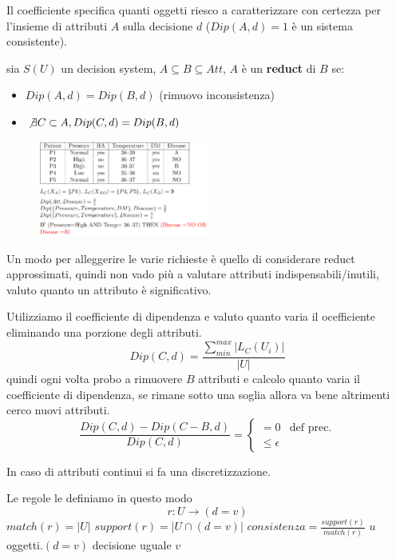 Il coefficiente specifica quanti oggetti riesco a caratterizzare con certezza per 
l'insieme di attributi $A$ sulla decisione $d$ ($Dip(A, d) =1$ è un sistema consistente). 

\begin{definizione}
    sia $S(U)$ un decision system,  $A\subseteq B\subseteq Att$, $A$ è un \textbf{reduct} di $B$ se:
    \begin{itemize}
        \item $Dip(A,d) =Dip(B,d)$ (rimuovo inconsistenza)
        \item $\not\exists C \subset A, Dip(C,d) =Dip(B,d)$
    \end{itemize}
\end{definizione}

\begin{figure}[!h]
    \centering
    \includegraphics[width=0.5\textwidth]{img/sistemi_incerti/rule-based-system-rough-apr2.png}
\end{figure}

Un modo per alleggerire le varie richieste è quello di considerare reduct approssimati,
quindi non vado più a valutare attributi indispensabili/inutili, valuto quanto 
un attributo è significativo. 

Utilizziamo il coefficiente di dipendenza e valuto quanto 
varia il ocefficiente eliminando una porzione degli attributi.
$$Dip(C,d) = \frac{\sum_{min}^{max}|L_C(U_i)|}{|U|}$$
quindi ogni volta probo a rimuovere $B$ attributi e calcolo quanto varia il coefficiente
di dipendenza, se rimane sotto una soglia allora va bene altrimenti cerco nuovi 
attributi.
$$\frac{Dip(C,d)-Dip(C-B,d)}{Dip(C,d)} = \begin{cases}
    =0 & \text{def prec.}\\
    \le \epsilon 
\end{cases}$$

\begin{nota}
    In caso di attributi continui si fa una discretizzazione.
\end{nota}

Le regole le definiamo in questo modo 
$$r:U \to (d=v)$$
$match(r) = |U|$
$support(r) = |U\cap (d=v)|$
$consistenza = \frac{support(r)}{match(r)}$
$u$ oggetti.$(d= v)$ decisione uguale $v$

